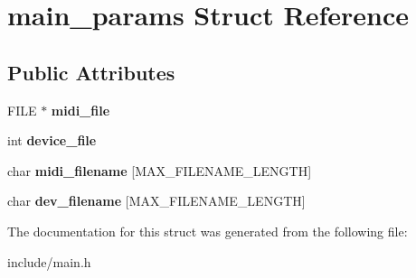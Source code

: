 \hypertarget{structmain__params}{\section{main\-\_\-params Struct Reference}
\label{structmain__params}
}
\subsection*{Public Attributes}
\begin{DoxyCompactItemize}
\item 
\hypertarget{structmain__params_a9eaa26f263d87cc4b8d0de019e7d7aa0}{F\-I\-L\-E $\ast$ {\bfseries midi\-\_\-file}}\label{structmain__params_a9eaa26f263d87cc4b8d0de019e7d7aa0}

\item 
\hypertarget{structmain__params_ad559aa0a7e7de590fb105fb64e79237d}{int {\bfseries device\-\_\-file}}\label{structmain__params_ad559aa0a7e7de590fb105fb64e79237d}

\item 
\hypertarget{structmain__params_a42bfe163e004189c2ca515ef8c39d850}{char {\bfseries midi\-\_\-filename} \mbox{[}M\-A\-X\-\_\-\-F\-I\-L\-E\-N\-A\-M\-E\-\_\-\-L\-E\-N\-G\-T\-H\mbox{]}}\label{structmain__params_a42bfe163e004189c2ca515ef8c39d850}

\item 
\hypertarget{structmain__params_a69b0de54c7bbe6e88cf79a291656cd38}{char {\bfseries dev\-\_\-filename} \mbox{[}M\-A\-X\-\_\-\-F\-I\-L\-E\-N\-A\-M\-E\-\_\-\-L\-E\-N\-G\-T\-H\mbox{]}}\label{structmain__params_a69b0de54c7bbe6e88cf79a291656cd38}

\end{DoxyCompactItemize}


The documentation for this struct was generated from the following file\-:\begin{DoxyCompactItemize}
\item 
include/main.\-h\end{DoxyCompactItemize}
